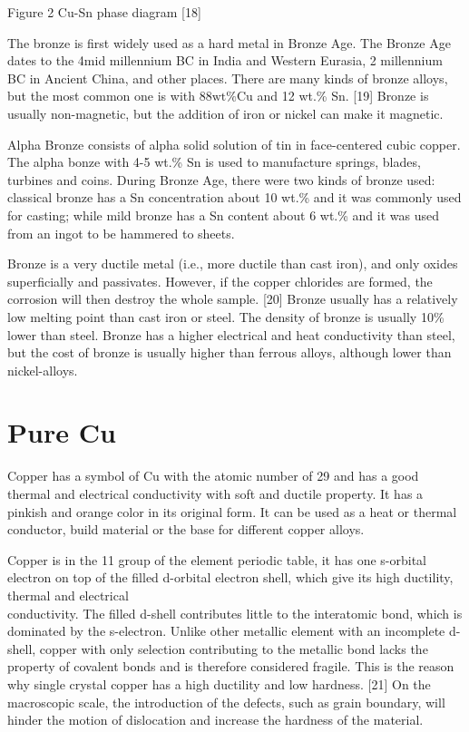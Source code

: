 \documentclass[10pt]{article}
\begin{document}
Figure 2 Cu-Sn phase diagram [18]

The bronze is first widely used as a hard metal in Bronze Age. The Bronze Age dates to the 4mid millennium BC in India and Western Eurasia, 2 millennium BC in Ancient China, and other places. There are many kinds of bronze alloys, but the most common one is with $88 \mathrm{wt} \% \mathrm{Cu}$ and 12 wt.\% Sn. [19] Bronze is usually non-magnetic, but the addition of iron or nickel can make it magnetic.

Alpha Bronze consists of alpha solid solution of tin in face-centered cubic copper. The alpha bonze with 4-5 wt.\% Sn is used to manufacture springs, blades, turbines and coins. During Bronze Age, there were two kinds of bronze used: classical bronze has a Sn concentration about 10 wt.\% and it was commonly used for casting; while mild bronze has a Sn content about 6 wt.\% and it was used from an ingot to be hammered to sheets.

Bronze is a very ductile metal (i.e., more ductile than cast iron), and only oxides superficially and passivates. However, if the copper chlorides are formed, the corrosion will then destroy the whole sample. [20] Bronze usually has a relatively low melting point than cast iron or steel. The density of bronze is usually 10\% lower than steel. Bronze has a higher electrical and heat conductivity than steel, but the cost of bronze is usually higher than ferrous alloys, although lower than nickel-alloys.

\section*{Pure Cu}
Copper has a symbol of $\mathrm{Cu}$ with the atomic number of 29 and has a good thermal and electrical conductivity with soft and ductile property. It has a pinkish and orange color in its original form. It can be used as a heat or thermal conductor, build material or the base for different copper alloys.

Copper is in the 11 group of the element periodic table, it has one s-orbital electron on top of the filled d-orbital electron shell, which give its high ductility, thermal and electrical\\
conductivity. The filled d-shell contributes little to the interatomic bond, which is dominated by the s-electron. Unlike other metallic element with an incomplete d-shell, copper with only selection contributing to the metallic bond lacks the property of covalent bonds and is therefore considered fragile. This is the reason why single crystal copper has a high ductility and low hardness. [21] On the macroscopic scale, the introduction of the defects, such as grain boundary, will hinder the motion of dislocation and increase the hardness of the material.
\end{document}
